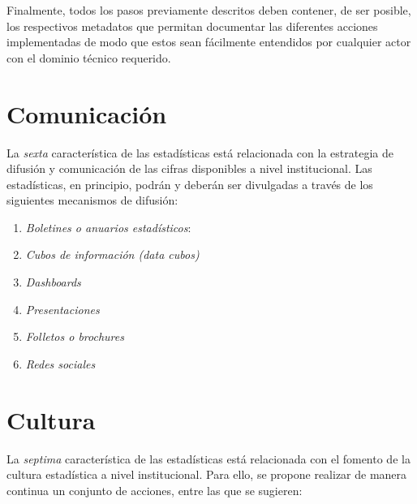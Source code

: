 \documentclass[
]{book}
\providecommand{\tightlist}{%
  \setlength{\itemsep}{0pt}\setlength{\parskip}{0pt}}
\begin{document}
Finalmente, todos los pasos previamente descritos deben contener, de ser posible, los respectivos metadatos que permitan documentar las diferentes acciones implementadas de modo que estos sean fácilmente entendidos por cualquier actor con el dominio técnico requerido.

\hypertarget{comunicaciuxf3n}{%
\section{Comunicación}\label{comunicaciuxf3n}}

La \emph{sexta} característica de las estadísticas está relacionada con la estrategia de difusión y comunicación de las cifras disponibles a nivel institucional. Las estadísticas, en principio, podrán y deberán ser divulgadas a través de los siguientes mecanismos de difusión:

\begin{enumerate}
\def\labelenumi{\arabic{enumi}.}
\tightlist
\item
  \emph{Boletines o anuarios estadísticos}:
\item
  \emph{Cubos de información (data cubos)}
\item
  \emph{Dashboards}
\item
  \emph{Presentaciones}
\item
  \emph{Folletos o brochures}
\item
  \emph{Redes sociales}
\end{enumerate}

\hypertarget{cultura}{%
\section{Cultura}\label{cultura}}

La \emph{septima} característica de las estadísticas está relacionada con el fomento de la cultura estadística a nivel institucional. Para ello, se propone realizar de manera continua un conjunto de acciones, entre las que se sugieren:
\end{document}
